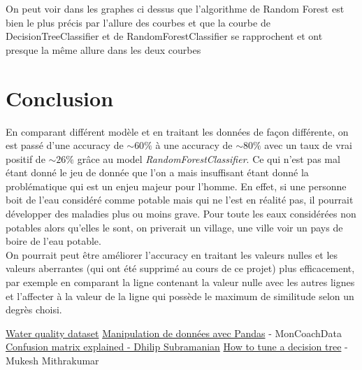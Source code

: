 \documentclass[12pt, a4paper]{article}
\begin{document}
    On peut voir dans les graphes ci dessus que l'algorithme de Random Forest est bien le plus précis par l'allure des courbes et que la courbe de DecisionTreeClassifier et de RandomForestClassifier se rapprochent et ont presque la même allure dans les deux courbes


\section{Conclusion}
En comparant différent modèle et en traitant les données de façon différente, on est passé d’une accuracy de $\sim60\%$ à une accuracy de $\sim80\%$ avec un taux de vrai positif de $\sim26\%$ grâce au model \textit{RandomForestClassifier}. Ce qui n’est pas mal étant donné le jeu de donnée que l’on a mais insuffisant étant donné la problématique qui est un enjeu majeur pour l’homme.
En effet, si une personne boit de l'eau considéré comme potable mais qui ne l'est en réalité pas, il pourrait développer des maladies plus ou moins grave. Pour toute les eaux considérées non potables alors qu'elles le sont, on priverait un village, une ville voir un pays de boire de l'eau potable.\\
On pourrait peut être améliorer l’accuracy en traitant les valeurs nulles et les valeurs aberrantes (qui ont été supprimé au cours de ce projet) plus efficacement, par exemple en comparant la ligne contenant la valeur nulle avec les autres lignes et l’affecter à la valeur de la ligne qui possède le maximum de similitude selon un degrès choisi.


\begin{thebibliography}{}
     \href{https://www.kaggle.com/adityakadiwal/water-potability}{Water quality dataset}
     \href{https://moncoachdata.com/blog/manipulation-de-donnees-avec-pandas/}{Manipulation de données avec Pandas} - MonCoachData
     \href{https://indiaai.gov.in/article/confusion-matrix-explained}{Confusion matrix explained - Dhilip Subramanian}
     \href{https://towardsdatascience.com/how-to-tune-a-decision-tree-f0321801680}{How to tune a decision tree} - Mukesh Mithrakumar
\end{thebibliography}
\end{document}
